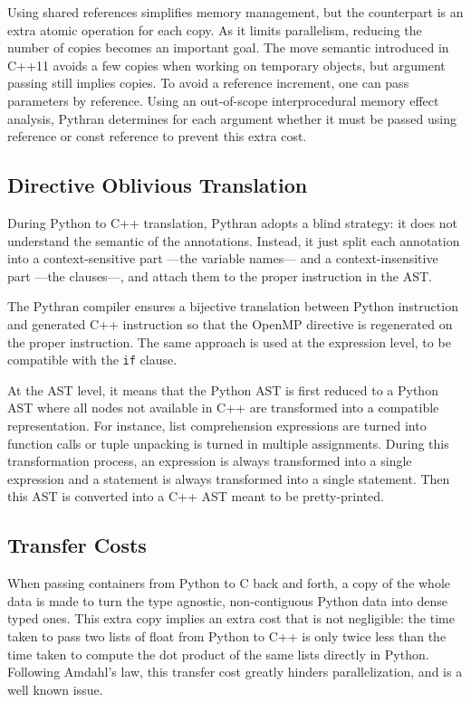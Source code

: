 \documentclass{llncs}
\begin{document}
Using shared references simplifies memory management, but the counterpart is an
extra atomic operation for each copy. As it limits parallelism, reducing the
number of copies becomes an important goal. The move semantic introduced in
C++11 avoids a few copies when working on temporary objects, but argument
passing still implies copies. To avoid a reference increment, one can pass
parameters by reference. Using an out-of-scope interprocedural memory effect
analysis, Pythran determines for each argument whether it must be passed using
reference or const reference to prevent this extra cost.

\subsection{Directive Oblivious Translation}

During Python to C++ translation, Pythran adopts a blind strategy: it does not
understand the semantic of the annotations. Instead, it just split each
annotation into a context-sensitive part ---the variable names--- and a
context-insensitive part ---the clauses---, and attach them to the proper
instruction in the AST.

The Pythran compiler ensures a bijective translation between Python instruction
and generated C++ instruction so that the OpenMP directive is regenerated on the
proper instruction. The same approach is used at the expression level, to be
compatible with the \texttt{if} clause.

At the AST level, it means that the Python AST is first reduced to a Python AST
where all nodes not available in C++ are transformed into a compatible
representation. For instance, list comprehension expressions are turned into
function calls or tuple unpacking is turned in multiple assignments. During this
transformation process, an expression is always transformed into a single expression
and a statement is always transformed into a single statement. Then this
AST is converted into a C++ AST meant to be pretty-printed.


\subsection{Transfer Costs}

When passing containers from Python to C back and forth, a copy of the whole
data is made to turn the type agnostic, non-contiguous Python data into dense
typed ones. This extra copy implies an extra cost that is not negligible: the
time taken to pass two lists of float from Python to C++ is only twice less than
the time taken to compute the dot product of the same lists directly in Python.
Following Amdahl's law, this transfer cost greatly hinders parallelization, and
is a well known issue.
\end{document}
